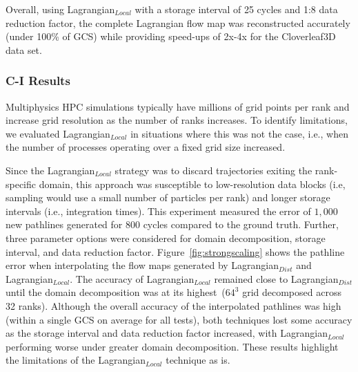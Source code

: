 %
%
%
%
%
%
%
Overall, using Lagrangian$_{Local}$ with a storage interval of 25 cycles and 1:8 data reduction factor, the complete Lagrangian flow map was reconstructed accurately (under 100\% of GCS) while providing speed-ups of 2x-4x for the Cloverleaf3D data set.


\vspace{-2mm}
\subsubsection{C-I Results} 
%

%
Multiphysics HPC simulations typically have millions of grid points per rank and increase grid resolution as the number of ranks increases. 
%
To identify limitations, we evaluated Lagrangian$_{Local}$ in situations where this was not the case, i.e., when the number of processes operating over a fixed grid size increased.
%
%

Since the Lagrangian$_{Local}$ strategy was to discard trajectories exiting the rank-specific domain, this approach was susceptible to low-resolution data blocks (i.e, sampling would use a small number of particles per rank) and longer storage intervals (i.e., integration times).
%
This experiment measured the error of $1,000$ new pathlines generated for 800 cycles compared to the ground truth. 
%
Further, three parameter options were considered for domain decomposition, storage interval, and data reduction factor. 
%
Figure~\ref{fig:strongscaling} shows the pathline error when interpolating the flow maps generated by Lagrangian$_{Dist}$ and Lagrangian$_{Local}$. 
%
The accuracy of Lagrangian$_{Local}$ remained close to Lagrangian$_{Dist}$ until the domain decomposition was at its highest~($64^{3}$ grid decomposed across 32 ranks).
%
%
Although the overall accuracy of the interpolated pathlines was high (within a single GCS on average for all tests), both techniques lost some accuracy as the storage interval and data reduction factor increased, with Lagrangian$_{Local}$ performing worse under greater domain decomposition.
%
These results highlight the limitations of the Lagrangian$_{Local}$ technique as is.
%

